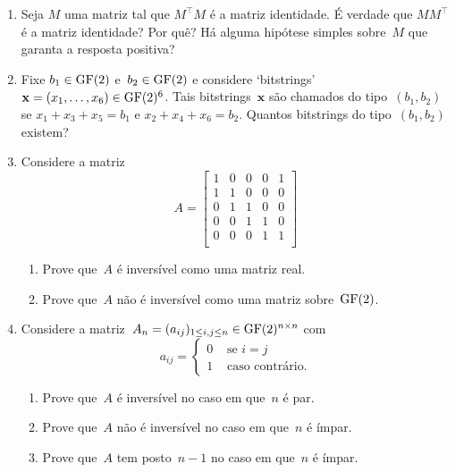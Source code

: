 \documentclass[11pt,reqno,a4paper]{amsart}
\def\bfx{\mathbf{x}}
\def\GF{\mathop{\rm GF}}
\def\rmlabel{\upshape({\itshape \roman*\,})}
\newcommand\nlabelQ{\bf\upshape Q\arabic*}
\begin{document}
\begin{enumerate}[label=\nlabelQ]
\item Seja $M$ uma matriz tal que $M^\top M$ é a matriz identidade.  É
  verdade que $MM^\top$ é a matriz identidade?  Por quê?  Há alguma
  hipótese simples sobre~$M$ que garanta a resposta positiva?
  
\item Fixe $b_1\in\GF(2)$ e~$b_2\in\GF(2)$ e considere `bitstrings'
  $\bfx=(x_1,\dots,x_6)\in\GF(2)^6$.  Tais bitstrings~$\bfx$ são
  chamados do tipo~$(b_1,b_2)$ se $x_1+x_3+x_5=b_1$ e
  $x_2+x_4+x_6=b_2$.  Quantos bitstrings do tipo~$(b_1,b_2)$ existem?
  
\item Considere a matriz
  \begin{equation}
    \label{eq:cycle}
    A=
    \begin{bmatrix}
      1&0&0&0&1\\
      1&1&0&0&0\\
      0&1&1&0&0\\
      0&0&1&1&0\\
      0&0&0&1&1\\
    \end{bmatrix}
  \end{equation}    
  \begin{enumerate}[label=\rmlabel]
  \item Prove que~$A$ é inversível como uma matriz real.
  \item Prove que~$A$ não é inversível como uma matriz
    sobre~$\GF(2)$.
  \end{enumerate}

\item Considere a
  matriz~$A_n=(a_{ij})_{1\leq i,j\leq n}\in\GF(2)^{n\times n}$ com
  \begin{equation}
    \label{eq:4}
    a_{ij}=
    \begin{cases}
      0 &\text{ se }i=j\\
      1 &\text{ caso contrário}.
    \end{cases}
  \end{equation}
  \begin{enumerate}[label=\rmlabel]
  \item Prove que~$A$ é inversível no caso em que~$n$ é par.
  \item Prove que~$A$ não é inversível no caso em que~$n$ é ímpar.
  \item Prove que~$A$ tem posto~$n-1$ no caso em que~$n$ é ímpar.
  \end{enumerate}


\end{enumerate}
\end{document}
